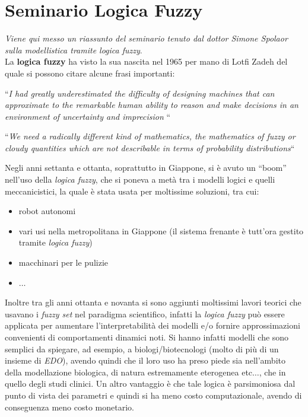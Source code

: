 \documentclass[a4paper,12pt, oneside]{book}
\begin{document}
\section{Seminario Logica Fuzzy}
\textit{Viene qui messo un riassunto del seminario tenuto dal dottor Simone
  Spolaor sulla modellistica tramite logica fuzzy}.\\
La \textbf{logica fuzzy} ha visto la sua nascita nel 1965 per mano di Lotfi
Zadeh del quale si possono citare alcune frasi importanti:
\begin{center}
  ``\textit{I had greatly underestimated the difficulty of designing machines
    that can approximate to the remarkable human ability to reason and
    make decisions in an environment of uncertainty and imprecision} ``
\end{center}
\begin{center}
  ``\textit{We need a radically different kind of mathematics, the mathematics
    of fuzzy or cloudy quantities which are not describable in terms of
    probability distributions}``
\end{center}
Negli anni settanta e ottanta, soprattutto in Giappone, si è avuto un ``boom''
nell'uso della 
\textit{logica fuzzy}, che si poneva a metà tra i modelli logici e quelli
meccanicistici, la quale è stata usata per moltissime soluzioni, tra cui:
\begin{itemize}
  \item robot autonomi
  \item vari usi nella metropolitana in Giappone (il sistema frenante è tutt'ora
  gestito tramite \textit{logica fuzzy})
  \item macchinari per le pulizie
  \item $\ldots$
\end{itemize}
Inoltre tra gli anni ottanta e novanta si sono aggiunti moltissimi lavori
teorici che usavano i \textit{fuzzy set} nel paradigma scientifico, infatti la
\textit{logica fuzzy} può essere applicata per aumentare l'interpretabilità dei
modelli e/o fornire approssimazioni convenienti di comportamenti dinamici
noti. Si hanno infatti modelli che sono semplici da spiegare, ad esempio, a
biologi/biotecnologi (molto di più di un insieme di \textit{EDO}), avendo quindi
che il loro uso ha preso piede sia nell'ambito della modellazione biologica, di
natura estremamente eterogenea etc$\ldots$, che in quello
degli studi clinici. Un altro vantaggio è che tale logica è parsimoniosa dal
punto di vista dei parametri e quindi si ha meno costo computazionale, avendo di
conseguenza meno costo monetario.\\ 
\end{document}
